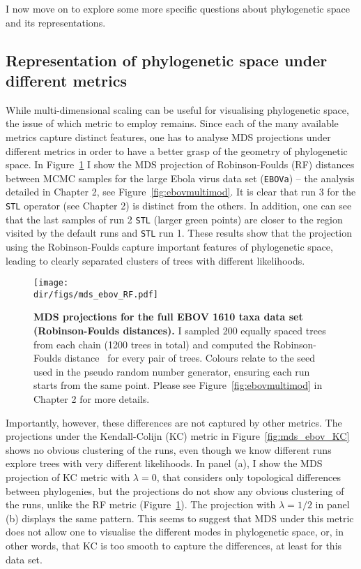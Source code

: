 I now move on to explore some more specific questions about phylogenetic space and its representations.

\subsection{Representation of phylogenetic space under different metrics}
\label{sec:representation}

While multi-dimensional scaling can be useful for visualising phylogenetic space, the issue of which metric to employ remains.
Since each of the many available metrics capture distinct features, one has to analyse MDS projections under different metrics in order to have a better grasp of the geometry of phylogenetic space.
In Figure~\ref{fig:mds_ebov_RF} I show the MDS projection of Robinson-Foulds (RF) distances between MCMC samples for the large Ebola virus data set (\verb|EBOVa|) -- the analysis detailed in Chapter 2, see Figure~\ref{fig:ebovmultimod}. 
It is clear that run 3 for the \verb|STL| operator (see Chapter 2) is distinct from the others. 
In addition, one can see that the last samples of run 2 \verb|STL| (larger green points) are closer to the region visited by the default runs and \verb|STL| run 1.
These results show that the projection using the Robinson-Foulds capture important features of phylogenetic space, leading to clearly separated clusters of trees with different likelihoods.

\begin{figure}[!ht]
\begin{center}
\texttt{[image: \\dir/figs/mds\_ebov\_RF.pdf]} 
\end{center}
 \caption[MDS projections for the full EBOV 1610 taxa data set (Robinson-Foulds distances).]{\textbf{MDS projections for the full EBOV 1610 taxa data set (Robinson-Foulds distances).}
 I sampled 200  equally spaced trees from each chain (1200 trees in total) and computed the Robinson-Foulds distance~\citep{Robinson1981} for every pair of trees.
 Colours relate to the seed used in the pseudo random number generator, ensuring each run starts from the same point. 
 Please see Figure~\ref{fig:ebovmultimod} in Chapter 2 for more details. 
 }
 \label{fig:mds_ebov_RF}
\end{figure}

Importantly, however, these differences are not captured by other metrics.
The projections under the Kendall-Colijn  (KC) metric in Figure~\ref{fig:mds_ebov_KC} shows no obvious clustering of the runs, even though we know different runs explore trees with very different likelihoods.
In panel (a), I show the MDS projection of KC metric  with $\lambda = 0$, that considers only topological differences between phylogenies, but the projections do not show any obvious clustering of the runs, unlike the RF metric (Figure~\ref{fig:mds_ebov_RF}).
The projection with $\lambda = 1/2$ in panel (b) displays the same pattern.
This seems to suggest that MDS under this metric does not allow one to visualise the different modes in phylogenetic space, or, in other words, that KC is too smooth to capture the differences, at least for this data set.

